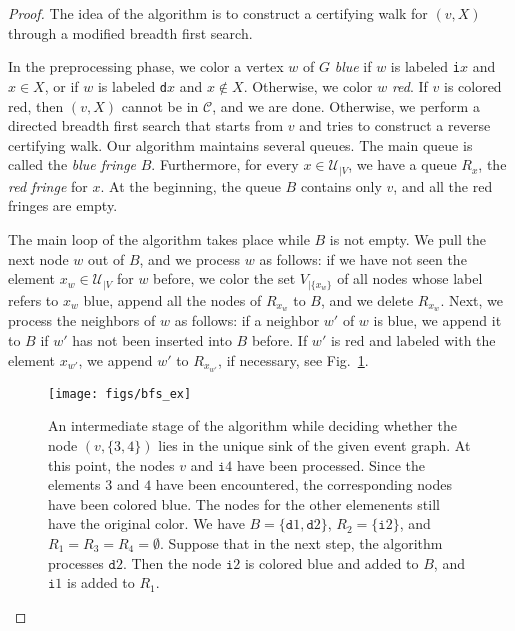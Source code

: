 \documentclass[oribibl,envcountsect,envcountsame]{llncs}
\newcommand{\C}{\mathcal C}
\newcommand{\U}{\mathcal U}
\begin{document}
\begin{proof}
The idea of the algorithm is to construct a certifying walk 
for $(v, X)$ through a modified breadth first search. 

In the preprocessing phase, we color a vertex $w$ of $G$ \emph{blue} if $w$ is 
labeled \texttt{i}$x$ and $x \in X$, or if $w$ is labeled
\texttt{d}$x$ and $x \not\in X$. Otherwise, we color $w$ \emph{red}. 
If $v$ is colored red, then $(v, X)$ cannot be in $\C$, and we are done. 
Otherwise, we perform 
a directed breadth first search that starts from $v$ and tries to
construct a reverse certifying walk.
Our algorithm maintains several queues.
The main queue is called the \emph{blue fringe} $B$. Furthermore,
for every $x \in \U_{|V}$, we have a queue $R_x$, the \emph{red fringe}
for $x$. At the beginning, the queue $B$ contains only $v$, and all
the red fringes are empty.

The main loop of the algorithm takes place while $B$ is not
empty. We pull the next node $w$ out of $B$, and we process
$w$ as follows: if we have not seen the element $x_w \in \U_{|V}$
for $w$ before, we color the set $V_{|\{x_w\}}$ of all nodes 
whose label refers to $x_w$ blue, append all the nodes of 
$R_{x_w}$ to $B$, and we delete $R_{x_w}$. Next, 
we process the neighbors of $w$ as follows: if a neighbor $w'$ of $w$ is blue,
we append it to $B$ if $w'$ has not been inserted into $B$ before. If $w'$ 
is red and labeled with the element $x_{w'}$, we append $w'$ to $R_{x_{w'}}$, 
if necessary, see Fig.~\ref{fig:bfs_ex}. 

\begin{figure}
\begin{center}
\texttt{[image: figs/bfs\_ex]}
\end{center}
\caption{An intermediate stage of the algorithm while deciding whether the 
  node $(v,\{3,4\})$ lies in the unique sink of the given event graph. At 
  this point, the nodes $v$ and $\texttt{i}4$ have been processed.
  Since the elements $3$ and $4$ have been encountered, the corresponding
  nodes have been colored blue. The nodes for the other elemenents still
  have the original color. We have $B = \{\texttt{d}1,
  \texttt{d}2\}$, $R_2 = \{\texttt{i}2\}$, and 
  $R_1 = R_3 =  R_4 = \emptyset$.  Suppose that in the next step,
  the algorithm processes $\texttt{d}2$. Then the node $\texttt{i}2$
  is colored blue and added to $B$, and $\texttt{i}1$ is added to
  $R_1$.
}
\label{fig:bfs_ex}
\end{figure}



\end{proof}
\end{document}
